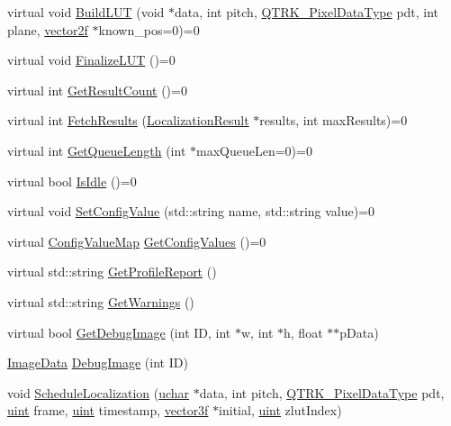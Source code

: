 \begin{DoxyCompactItemize}
\item 
virtual void \hyperlink{class_queued_tracker_aaeb04a5a2a4fe47ef48b8aefabc1bdb7}{Build\+L\+UT} (void $\ast$data, int pitch, \hyperlink{qtrk__c__api_8h_aad82367b3ea592a142bb50a2fb538b0b}{Q\+T\+R\+K\+\_\+\+Pixel\+Data\+Type} pdt, int plane, \hyperlink{std__incl_8h_aba974726076ec2d63a67114c536d123e}{vector2f} $\ast$known\+\_\+pos=0)=0
\item 
virtual void \hyperlink{class_queued_tracker_aa856650c99d15216ad3246d3485b9d9e}{Finalize\+L\+UT} ()=0
\item 
virtual int \hyperlink{class_queued_tracker_a362a26027dc6bd40864e59de1ac32de2}{Get\+Result\+Count} ()=0
\item 
virtual int \hyperlink{class_queued_tracker_a171688832558d40838790c90ba9f8fc0}{Fetch\+Results} (\hyperlink{struct_localization_result}{Localization\+Result} $\ast$results, int max\+Results)=0
\item 
virtual int \hyperlink{class_queued_tracker_a7109701fb33a1eb1f4a5512205cb7bde}{Get\+Queue\+Length} (int $\ast$max\+Queue\+Len=0)=0
\item 
virtual bool \hyperlink{class_queued_tracker_a8b879a9359f4e2081e69b0932f8e9908}{Is\+Idle} ()=0
\item 
virtual void \hyperlink{class_queued_tracker_a0d96ad4feea320c3ba90d196b4690d3b}{Set\+Config\+Value} (std\+::string name, std\+::string value)=0
\item 
virtual \hyperlink{class_queued_tracker_af6073682cd9e87e6f3e84f93cf9be373}{Config\+Value\+Map} \hyperlink{class_queued_tracker_afdb95cbf31f14716b3872e15a2319d62}{Get\+Config\+Values} ()=0
\item 
virtual std\+::string \hyperlink{class_queued_tracker_afb595aa118f6cd87b4502d2cdfe53215}{Get\+Profile\+Report} ()
\item 
virtual std\+::string \hyperlink{class_queued_tracker_aafb754ef37092a96f95a3094eba58398}{Get\+Warnings} ()
\item 
virtual bool \hyperlink{class_queued_tracker_aeae109b520ca5b15e008030edfc179c4}{Get\+Debug\+Image} (int ID, int $\ast$w, int $\ast$h, float $\ast$$\ast$p\+Data)
\item 
\hyperlink{_queued_tracker_8h_a2d6726594ce64e82b9222b183f2571d1}{Image\+Data} \hyperlink{class_queued_tracker_a37756db08d454ad904193dd4e6f652b1}{Debug\+Image} (int ID)
\item 
void \hyperlink{class_queued_tracker_a43a79ee2536d7e32f2168a19fc978f14}{Schedule\+Localization} (\hyperlink{std__incl_8h_a65f85814a8290f9797005d3b28e7e5fc}{uchar} $\ast$data, int pitch, \hyperlink{qtrk__c__api_8h_aad82367b3ea592a142bb50a2fb538b0b}{Q\+T\+R\+K\+\_\+\+Pixel\+Data\+Type} pdt, \hyperlink{std__incl_8h_a91ad9478d81a7aaf2593e8d9c3d06a14}{uint} frame, \hyperlink{std__incl_8h_a91ad9478d81a7aaf2593e8d9c3d06a14}{uint} timestamp, \hyperlink{std__incl_8h_a2feaef1d85a74bd5cf80df91b1a9a914}{vector3f} $\ast$initial, \hyperlink{std__incl_8h_a91ad9478d81a7aaf2593e8d9c3d06a14}{uint} zlut\+Index)
$$
\end{DoxyCompactItemize}
